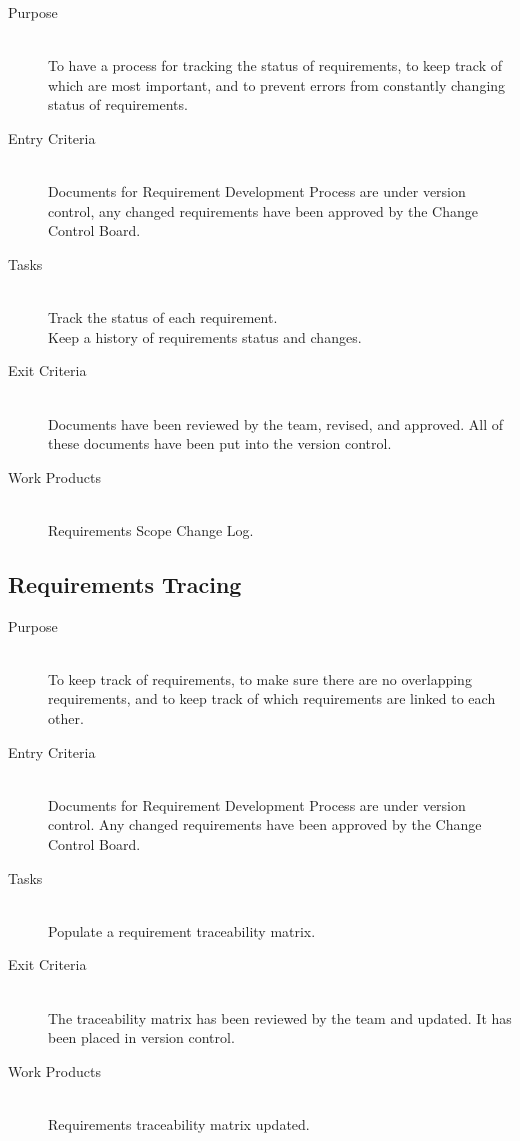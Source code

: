 \documentclass[11pt]{article}
\begin{document}
\begin{description}

\item[Purpose] \hfill \\
To have a process for tracking the status of requirements, to keep track of which are most important, and to prevent errors from constantly changing status of requirements.


\item[Entry Criteria]\hfill \\
Documents for Requirement Development Process are under version control, any changed requirements have been approved by the Change Control Board.

\item[Tasks]\hfill \\
Track the status of each requirement.\\
Keep a history of requirements status and changes.\\


\item[Exit Criteria]\hfill \\
Documents have been reviewed by the team, revised, and approved. All of these documents have been put into the version control.

\item[Work Products]\hfill \\
Requirements Scope Change Log.


\end{description}

\newpage

\subsection{Requirements Tracing}

\begin{description}

\item[Purpose] \hfill \\
To keep track of requirements, to make sure there are no overlapping requirements, and to keep track of which requirements are linked to each other.

\item[Entry Criteria]\hfill \\
Documents for Requirement Development Process are under version control. Any changed requirements have been approved by the Change Control Board.

\item[Tasks]\hfill \\
Populate a requirement traceability matrix.

\item[Exit Criteria]\hfill \\
The traceability matrix has been reviewed by the team and
updated. It has been placed in version control.

\item[Work Products]\hfill \\
Requirements traceability matrix updated.

\end{description}
   
\end{document}
